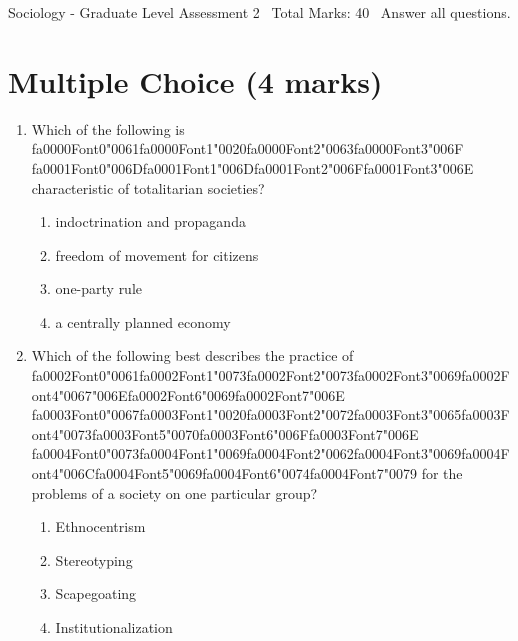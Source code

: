 \documentclass[12pt]{article}
\begin{document}
\begin{center}
Sociology - Graduate Level Assessment 2 \
Total Marks: 40 \
Answer all questions.
\end{center}

\section*{Multiple Choice (4 marks)}
\begin{enumerate}[label=\arabic*.]
\item Which of the following is {\csname fa0000Font0\endcsname\char"0061}{\csname fa0000Font1\endcsname\char"0020}{\csname fa0000Font2\endcsname\char"0063}{\csname fa0000Font3\endcsname\char"006F} {\csname fa0001Font0\endcsname\char"006D}{\csname fa0001Font1\endcsname\char"006D}{\csname fa0001Font2\endcsname\char"006F}{\csname fa0001Font3\endcsname\char"006E} characteristic of totalitarian societies?
\begin{enumerate}[label=(\alph*)]
    \item indoctrination and propaganda
    \item freedom of movement for citizens
    \item one-party rule
    \item a centrally planned economy
\end{enumerate}
\item Which of the following best describes the practice of {\csname fa0002Font0\endcsname\char"0061}{\csname fa0002Font1\endcsname\char"0073}{\csname fa0002Font2\endcsname\char"0073}{\csname fa0002Font3\endcsname\char"0069}{\csname fa0002Font4\endcsname\char"0067}{\char"006E}{\csname fa0002Font6\endcsname\char"0069}{\csname fa0002Font7\endcsname\char"006E} {\csname fa0003Font0\endcsname\char"0067}{\csname fa0003Font1\endcsname\char"0020}{\csname fa0003Font2\endcsname\char"0072}{\csname fa0003Font3\endcsname\char"0065}{\csname fa0003Font4\endcsname\char"0073}{\csname fa0003Font5\endcsname\char"0070}{\csname fa0003Font6\endcsname\char"006F}{\csname fa0003Font7\endcsname\char"006E} {\csname fa0004Font0\endcsname\char"0073}{\csname fa0004Font1\endcsname\char"0069}{\csname fa0004Font2\endcsname\char"0062}{\csname fa0004Font3\endcsname\char"0069}{\csname fa0004Font4\endcsname\char"006C}{\csname fa0004Font5\endcsname\char"0069}{\csname fa0004Font6\endcsname\char"0074}{\csname fa0004Font7\endcsname\char"0079} for the problems of a society on one particular group?
\begin{enumerate}[label=(\alph*)]
    \item Ethnocentrism
    \item Stereotyping
    \item Scapegoating
    \item Institutionalization
\end{enumerate}
\end{enumerate}
\end{document}
